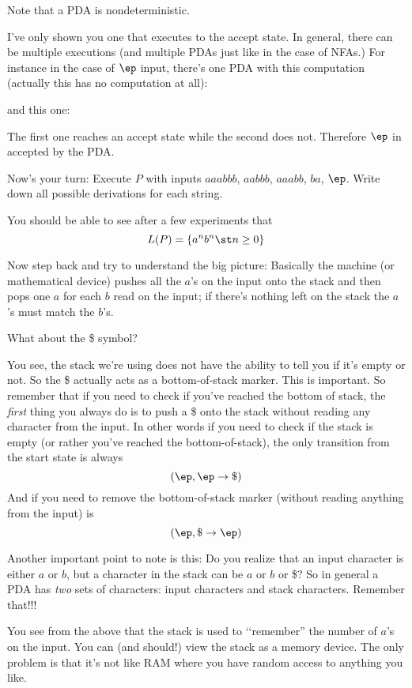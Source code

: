 Note that a PDA is nondeterministic.

I've only shown you one that executes to the accept state.
In general, there can be multiple executions (and multiple PDAs
just like in the case of NFAs.)
For instance in the case of $\ep$ input,
there's one PDA with this computation (actually this has
no computation at all):



and this one:



The first one reaches an accept state while the second does not.
Therefore $\ep$ in accepted by the PDA.

\newpage
\begin{ex}
Now's your turn: Execute $P$ with inputs $aaabbb$, $aabbb$, $aaabb$, 
$ba$, $\ep$.
Write down all possible derivations for each string.
\end{ex}


\newpage
You should be able to see after a few experiments that
\[
L(P) = \{a^n b^n \st n \geq 0\}
\]

Now step back and try to understand the big picture:
Basically the machine (or mathematical device) pushes all the $a$'s on the
input onto the stack and then pops one $a$ for each $b$ read on the input;
if there's nothing left on the stack the $a$'s must match the $b$'s.

What about the \$ symbol?

You see, the stack we're using does not have the ability to tell you if it's
empty or not.
So the \$ actually acts as a bottom-of-stack marker.
This is important.
So remember that if you need to check if you've reached the bottom of stack,
the \textit{ first} thing you always do is to push a \$ onto the stack without
reading any character from the input.
In other words if you need to check if the stack is empty (or rather
you've reached the bottom-of-stack), the only transition from the start
state is always
\[
(\ep, \ep \rightarrow \$)
\]
And if you need to remove the bottom-of-stack marker (without reading anything
from the input) is
\[
(\ep, \$ \rightarrow \ep)
\]

Another important point to note is this:
Do you realize that an input character is either $a$ or $b$, but a character
in the stack can be $a$ or $b$ or \$?
So in general a PDA has \textit{ two} sets of characters:
input characters and stack characters.
Remember that!!!

You see from the above
that the stack is used to \lq\lq remember'' the number of $a$'s on
the input.
You can (and should!) view the stack as a memory device.
The only problem is that it's not like RAM where you have random access to
anything you like.




